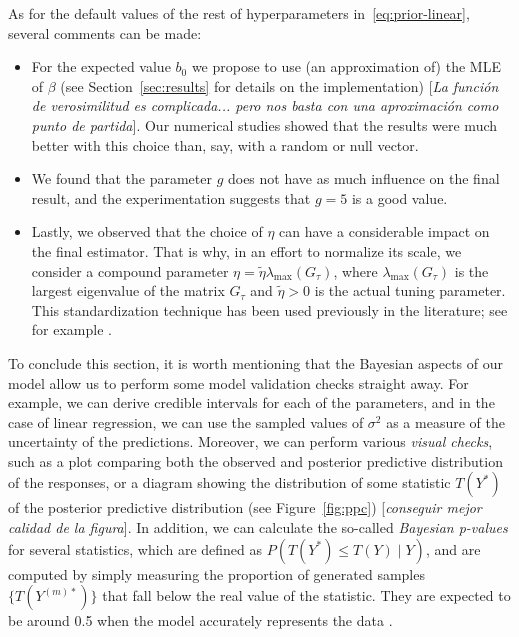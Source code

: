 \documentclass[ba]{imsart}
\numberwithin{equation}{section}
\theoremstyle{plain}
\newcommand\incomment[2][comment-red]{\color{#1}[\textit{#2}]\color{black}}
\begin{document}
As for the default values of the rest of hyperparameters in~\eqref{eq:prior-linear}, several comments can be made:
\begin{itemize}
  \item For the expected value \(b_0\) we propose to use (an approximation of) the MLE of \(\beta\) (see Section~\ref{sec:results} for details on the implementation) \incomment{La función de verosimilitud es complicada... pero nos basta con una aproximación como punto de partida}. Our numerical studies showed that the results were much better with this choice than, say, with a random or null vector.
  \item We found that the parameter \(g\) does not have as much influence on the final result, and the experimentation suggests that \(g=5\) is a good value.
  \item Lastly, we observed that the choice of \(\eta\) can have a considerable impact on the final estimator. That is why, in an effort to normalize its scale, we consider a compound parameter \(\eta = \tilde \eta \lambda_{\max}(G_\tau)\), where \(\lambda_{\max}(G_\tau)\) is the largest eigenvalue of the matrix \(G_\tau\) and \(\tilde\eta > 0\) is the actual tuning parameter. This standardization technique has been used previously in the literature; see for example \citet{grollemund2019bayesian}.
\end{itemize}

To conclude this section, it is worth mentioning that the Bayesian aspects of our model allow us to perform some model validation checks straight away. For example, we can derive credible intervals for each of the parameters, and in the case of linear regression, we can use the sampled values of \(\sigma^2\) as a measure of the uncertainty of the predictions. Moreover, we can perform various \textit{visual checks}, such as a plot comparing both the observed and posterior predictive distribution of the responses, or a diagram showing the distribution of some statistic \(T(Y^*)\) of the posterior predictive distribution (see Figure~\ref{fig:ppc}) \incomment{conseguir mejor calidad de la figura}. In addition, we can calculate the so-called \textit{Bayesian p-values} for several statistics, which are defined as \(P(T(Y^*)\leq T(Y)\mid Y)\), and are computed by simply measuring the proportion of generated samples \(\{T(Y^{(m)*})\}\) that fall below the real value of the statistic. They are expected to be around 0.5 when the model accurately represents the data \citep[see][Ch.~6]{gelman1995bayesian}.
\end{document}
